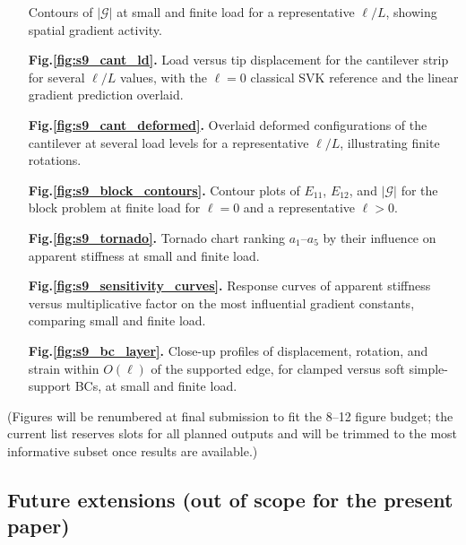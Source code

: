 \documentclass[11pt]{article}
\begin{document}
\begin{enumerate}
    Contours of $|\bm{\mathcal{G}}|$ at small and finite
    load for a representative $\ell/L$, showing spatial
    gradient activity.
  \item[\textbf{Fig.\ref{fig:s9_cant_ld}.}]
    Load versus tip displacement for the cantilever strip
    for several $\ell/L$ values, with the $\ell=0$ classical
    SVK reference and the linear gradient prediction
    overlaid.
  \item[\textbf{Fig.\ref{fig:s9_cant_deformed}.}]
    Overlaid deformed configurations of the cantilever at
    several load levels for a representative $\ell/L$,
    illustrating finite rotations.
  \item[\textbf{Fig.\ref{fig:s9_block_contours}.}]
    Contour plots of $E_{11}$, $E_{12}$, and
    $|\bm{\mathcal{G}}|$ for the block problem at finite
    load for $\ell=0$ and a representative $\ell>0$.
  \item[\textbf{Fig.\ref{fig:s9_tornado}.}]
    Tornado chart ranking $a_1$--$a_5$ by their influence
    on apparent stiffness at small and finite load.
  \item[\textbf{Fig.\ref{fig:s9_sensitivity_curves}.}]
    Response curves of apparent stiffness versus
    multiplicative factor on the most influential
    gradient constants, comparing small and finite load.
  \item[\textbf{Fig.\ref{fig:s9_bc_layer}.}]
    Close-up profiles of displacement, rotation, and strain
    within $O(\ell)$ of the supported edge, for clamped
    versus soft simple-support BCs, at small and finite load.
\end{enumerate}

\noindent (Figures will be renumbered at final submission to fit
the 8--12 figure budget; the current list reserves slots for all
planned outputs and will be trimmed to the most informative subset
once results are available.)

\subsection{Future extensions (out of scope for the present paper)}
\label{ssec:future}
\end{document}
